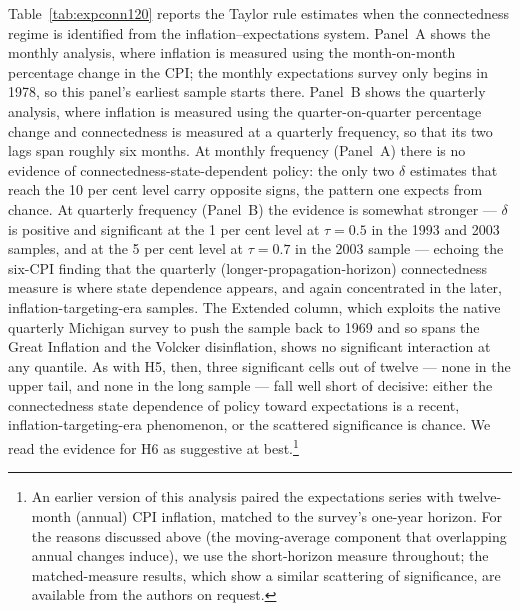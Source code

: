 \documentclass{article}
\begin{document}
Table~\ref{tab:expconn120} reports the Taylor rule estimates when the connectedness
regime is identified from the inflation--expectations system. Panel~A shows the monthly analysis, where inflation is measured using the month-on-month percentage change in the CPI; the monthly expectations survey only begins in 1978, so this panel's earliest sample starts there. Panel~B shows the quarterly analysis, where inflation is measured using the quarter-on-quarter percentage change and connectedness is measured at a quarterly frequency, so that its two lags span roughly six months. At monthly frequency (Panel~A) there is no evidence of connectedness-state-dependent policy: the only two $\delta$ estimates that reach the 10 per cent level carry opposite signs, the pattern one expects from chance. At quarterly frequency (Panel~B) the evidence is somewhat stronger --- $\delta$ is positive and significant at the 1 per cent level at $\tau=0.5$ in the 1993 and 2003 samples, and at the 5 per cent level at $\tau=0.7$ in the 2003 sample --- echoing the six-CPI finding that the quarterly (longer-propagation-horizon) connectedness measure is where state dependence appears, and again concentrated in the later, inflation-targeting-era samples. The Extended column, which exploits the native quarterly Michigan survey to push the sample back to 1969 and so spans the Great Inflation and the Volcker disinflation, shows no significant interaction at any quantile. As with H5, then, three significant cells out of twelve --- none in the upper tail, and none in the long sample --- fall well short of decisive: either the connectedness state dependence of policy toward expectations is a recent, inflation-targeting-era phenomenon, or the scattered significance is chance. We read the evidence for H6 as suggestive at best.\footnote{An earlier version of this analysis paired the expectations series with twelve-month (annual) CPI inflation, matched to the survey's one-year horizon. For the reasons discussed above (the moving-average component that overlapping annual changes induce), we use the short-horizon measure throughout; the matched-measure results, which show a similar scattering of significance, are available from the authors on request.}
\end{document}
